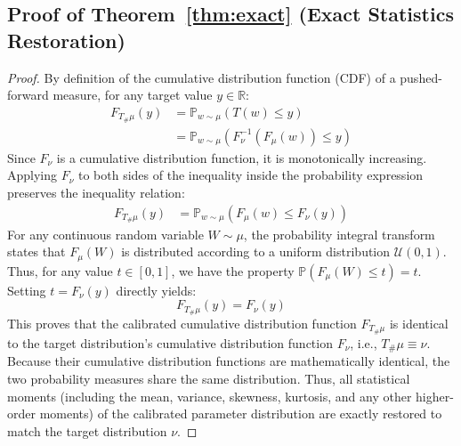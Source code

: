 \documentclass{article}
\theoremstyle{plain}
\theoremstyle{definition}
\theoremstyle{remark}
\begin{document}
\subsection{Proof of Theorem~\ref{thm:exact} (Exact Statistics Restoration)}
\label{app:proof_exact}
\begin{proof}
  By definition of the cumulative distribution function (CDF) of a pushed-forward measure, for any target value $y \in \mathbb{R}$:
  \begin{align}
    F_{T_\# \mu}(y) &= \mathbb{P}_{w \sim \mu}(T(w) \leq y) \nonumber \\
    &= \mathbb{P}_{w \sim \mu}\left(F_{\nu}^{-1}(F_{\mu}(w)) \leq y\right)
  \end{align}
  Since $F_{\nu}$ is a cumulative distribution function, it is monotonically increasing. Applying $F_{\nu}$ to both sides of the inequality inside the probability expression preserves the inequality relation:
  \begin{align}
    F_{T_\# \mu}(y) &= \mathbb{P}_{w \sim \mu}\left(F_{\mu}(w) \leq F_{\nu}(y)\right)
  \end{align}
  For any continuous random variable $W \sim \mu$, the probability integral transform states that $F_{\mu}(W)$ is distributed according to a uniform distribution $\mathcal{U}(0, 1)$. Thus, for any value $t \in [0, 1]$, we have the property $\mathbb{P}(F_{\mu}(W) \leq t) = t$. Setting $t = F_{\nu}(y)$ directly yields:
  \begin{equation}
    F_{T_\# \mu}(y) = F_{\nu}(y)
  \end{equation}
  This proves that the calibrated cumulative distribution function $F_{T_\# \mu}$ is identical to the target distribution's cumulative distribution function $F_{\nu}$, i.e., $T_\# \mu \equiv \nu$. Because their cumulative distribution functions are mathematically identical, the two probability measures share the same distribution. Thus, all statistical moments (including the mean, variance, skewness, kurtosis, and any other higher-order moments) of the calibrated parameter distribution are exactly restored to match the target distribution $\nu$.
\end{proof}
\end{document}

